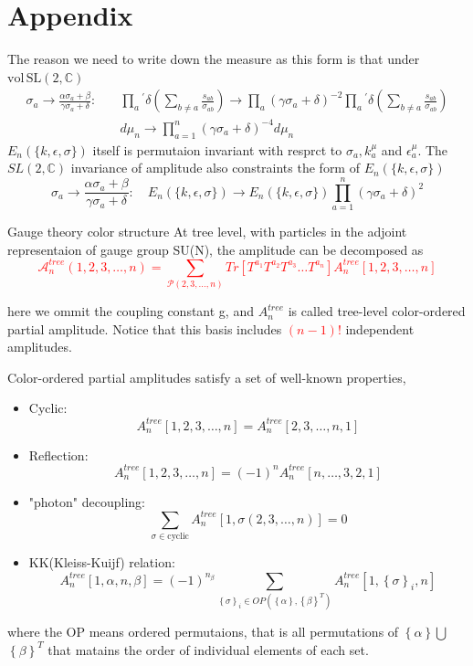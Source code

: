 \documentclass{beamer}
\begin{document}
\section{Appendix}
\appendix
\begin{frame}
    The reason we need to write down the measure as this form is that under $\mathrm{vol\,SL}(2,\mathbb{C})$
    \begin{align*}
        \sigma_a\to\frac{\alpha\sigma_a+\beta}{\gamma\sigma_a+\delta}:\quad&\prod_{a}{}^{\prime}\delta{\left(\sum_{b\neq a}\frac{s_{ab}}{\sigma_{ab}}\right)}\rightarrow\prod_{a}(\gamma\sigma_a+\delta)^{-2}\prod_{a}{}^{\prime}\delta{\left(\sum_{b\neq a}\frac{s_{ab}}{\sigma_{ab}}\right)}\\
        \quad &d\mu_n\to\prod_{a=1}^n(\gamma\sigma_a+\delta)^{-4}d\mu_n
    \end{align*}
    $E_n(\{k,\epsilon,\sigma\})$ itself is permutaion invariant with resprct to $\sigma_a,k_a^\mu$ and $\epsilon_a^\mu$. The $SL(2,\mathbb{C})$ invariance of amplitude also 
    constraints the form of $E_n(\{k,\epsilon,\sigma\})$
    \begin{equation*}
        \sigma_a\to\frac{\alpha\sigma_a+\beta}{\gamma\sigma_a+\delta}:\quad E_n(\{k,\epsilon,\sigma\})\to E_n(\{k,\epsilon,\sigma\})\prod_{a=1}^n(\gamma\sigma_a+\delta)^2
    \end{equation*}
\end{frame}
\begin{frame}{Gauge theory color structure}
    At tree level, with particles in the adjoint representaion of gauge group SU(N), the amplitude can be 
decomposed as
\textcolor{red}{\begin{equation*}
    \mathcal{A}_n^{tree}(1,2,3,\dots,n)=\sum _{\mathcal{P}(2,3,\dots,n)}Tr[T^{a_1}T^{a_2}T^{a_3}\dots
    T^{a_n}]A_n^{tree}[1,2,3,\dots,n]
\end{equation*}}

here we ommit the coupling constant g, and $A_n^{tree}$ is called tree-level color-ordered partial amplitude.
Notice that this basis includes \textcolor{red}{$(n-1)!$} independent amplitudes.
\end{frame}
\begin{frame}
    Color-ordered partial amplitudes satisfy a set of well-known properties,
    \begin{itemize}
        \item Cyclic:\quad $$A_n^{tree}[1,2,3,\dots,n]=A_n^{tree}[2,3,\dots,n,1]$$
        \item Reflection: \quad $$A_n^{tree}[1,2,3,\dots,n]=(-1)^nA_n^{tree}[n,\dots,3,2,1]$$
        \item "photon" decoupling: \quad $$\sum_{\sigma\in \text{cyclic}}A_n^{tree}[1,\sigma(2,3,\dots,n)]=0$$
        \item KK(Kleiss-Kuijf) relation:\quad $$A_n^{tree}[1,{\alpha},n,{\beta}]=(-1)^{n_\beta}
        \sum_{\left\{\sigma\right\}_i\in OP(\left\{\alpha\right\},\left\{\beta\right\}^T)}A_n^{tree}[1,\left\{\sigma\right\}_i,n]$$
    \end{itemize}
    where the OP means ordered permutaions, that is all permutations of $\left\{\alpha\right\}$$\bigcup$$\left\{\beta\right\}^T$
    that matains the order of individual elements of each set.
\end{frame}
\end{document}
